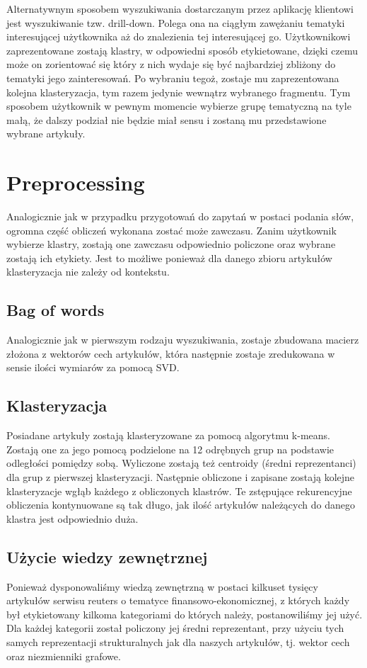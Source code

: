 Alternatywnym sposobem wyszukiwania dostarczanym
 przez aplikację klientowi jest wyszukiwanie tzw. drill-down. 
 Polega ona na ciągłym zawężaniu tematyki interesującej
 użytkownika aż do znalezienia tej interesującej go.
Użytkownikowi zaprezentowane zostają klastry, w odpowiedni sposób etykietowane, dzięki czemu może on zorientować się który z nich wydaje się być najbardziej zbliżony do tematyki jego zainteresowań. Po wybraniu tegoż, zostaje mu zaprezentowana kolejna klasteryzacja, tym razem jedynie wewnątrz wybranego fragmentu. Tym sposobem użytkownik w pewnym momencie wybierze grupę tematyczną na tyle małą, że dalszy podział nie będzie miał sensu i zostaną mu przedstawione wybrane artykuły.

\section{Preprocessing}
Analogicznie jak w przypadku przygotowań do zapytań w postaci podania słów, ogromna część obliczeń wykonana zostać może zawczasu. Zanim użytkownik wybierze klastry, zostają one zawczasu odpowiednio policzone oraz wybrane zostają ich etykiety. Jest to możliwe ponieważ dla danego zbioru artykułów klasteryzacja nie zależy od kontekstu.

\subsection{Bag of words}
Analogicznie jak w pierwszym rodzaju wyszukiwania, zostaje zbudowana macierz złożona z wektorów cech artykułów, która następnie zostaje zredukowana w sensie ilości wymiarów za pomocą SVD.

\subsection{Klasteryzacja}
Posiadane artykuły zostają klasteryzowane za pomocą algorytmu k-means. Zostają one za jego pomocą podzielone na 12 odrębnych grup na podstawie odległości pomiędzy sobą. Wyliczone zostają też centroidy (średni reprezentanci) dla grup z pierwszej klasteryzacji. Następnie obliczone i zapisane zostają kolejne klasteryzacje wgłąb każdego z obliczonych klastrów. Te zstępujące rekurencyjne obliczenia kontynuowane są tak długo, jak ilość artykułów należących do danego klastra jest odpowiednio duża.  

\subsection{Użycie wiedzy zewnętrznej}
Ponieważ dysponowaliśmy wiedzą zewnętrzną w postaci kilkuset tysięcy artykułów serwisu reuters o tematyce finansowo-ekonomicznej, z których każdy był etykietowany kilkoma kategoriami do których należy, postanowiliśmy jej użyć. Dla każdej kategorii został policzony jej średni reprezentant, przy użyciu tych samych reprezentacji strukturalnych jak dla naszych artykułów, tj. wektor cech oraz niezmienniki grafowe.

